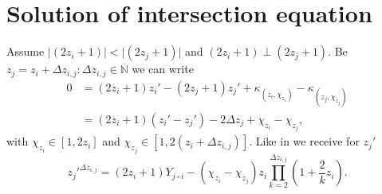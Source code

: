 \section{Solution of intersection equation}
\label{s:solutionofintersection}
Assume $\vert\left(2z_{i} + 1\right)\vert < \vert\left(2z_{j} + 1\right)\vert$ and $\left(2z_{i} + 1\right) \perp \left(2z_{j} + 1\right)$. Be $z_{j} = z_{i} + \Delta z_{i,j}:\Delta z_{i,j} \in \mathbb{N}$ we can write
\begin{equation}\begin{split}
	0 & = \left(2z_{i} + 1\right)z_{i}\prime - \left(2z_{j} + 1\right)z_{j}\prime + \kappa_{\left(z_{i}, \chi_{z_{i}}\right)} - \kappa_{\left(z_{j}, \chi_{z_{j}}\right)} \\
	& = \left(2z_{i} + 1\right)\left(z_{i}\prime - z_{j}\prime\right) - 2\Delta z_{j} + \chi_{z_{i}} - \chi_{z_{j}},
\end{split}\label{eq:intersectionDeltaz}\end{equation}
with $\chi_{z_{i}} \in [ 1, 2z_{i}]$ and $\chi_{z_{j}} \in [1, 2\left(z_{i} + \Delta z_{i,j}\right)]$. Like in \cite{2014arXiv1411.2824Z} we receive for $z_{j}\prime$
\begin{equation}
	z_{j}\prime^{\Delta z_{i,j}} = \left(2z_{i} + 1\right)Y_{j \circ i} - \left(\chi_{z_{i}} - \chi_{z_{j}}\right)z_{i}\prod_{k=2}^{\Delta z_{i,j}} \left(1 + \frac{2}{k}z_{i}\right).
\label{eq:zjsolution}\end{equation}








\nocite{*}
\newpage
%



